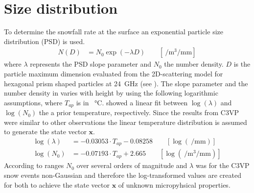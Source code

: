 \section{Size distribution} \label{sec:size_dist}
To determine the snowfall rate at the surface an exponential particle size distribution (PSD) is used. 
\begin{align}
	N(D) & = N_{0} \exp\left(-\lambda D\right) \qquad [ \SI{}{\per\cubic\metre\per\mm} ] \label{eq:num_dens}
\end{align}
where $\lambda$ represents the PSD slope parameter and $N_{0}$ the number density. $D$ is the particle maximum dimension evaluated from the 2D-scattering model for hexagonal prism shaped particles at \SI{24}{\giga\Hz} (see ).
The slope parameter and the number density in  varies with height by using the following logarithmic assumptions, where $T_{ap}$ is in \SI{}{\celsius}. \cite{wood_estimation_2011} showed a linear fit between $\log(\lambda)$ and $\log(N_0)$ the a prior temperature, respectively. Since the results from C3VP were similar to other observations the linear temperature distribution is assumed to generate the state vector $\mathbf{x}$.
\begin{align}
	\log(\lambda) & = -0.03053 \cdot T_{ap} - 0.08258  \label{eq:lambda} \qquad [ \log(\SI{}{\per\mm}) ]\\
    \log(N_0) & = -0.07193 \cdot T_{ap} +2.665  \qquad [ \log(\SI{}{\per\cubic\metre\per\mm})]
\label{eq:N0}
\end{align}
According to \cite{wood_level_2013} ranges $N_0$ over several orders of magnitude and $\lambda$ was for the C3VP \citep{hudak_canadian_2006} snow events non-Gaussian and therefore the log-transformed values are created for both to achieve the state vector $\mathbf{x}$ of unknown micropyhsical properties.
